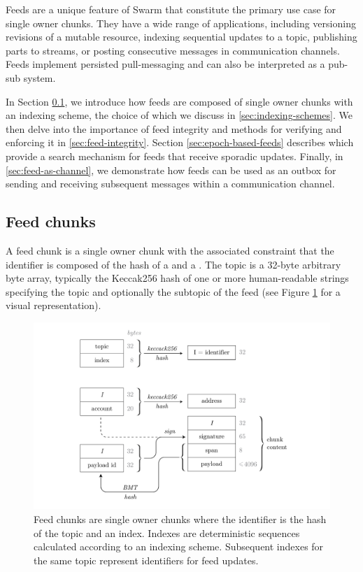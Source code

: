\green{}

Feeds are a unique feature of Swarm that constitute the primary use case for single owner chunks. They have a wide range of applications, including versioning revisions of a mutable resource, indexing sequential updates to a topic, publishing parts to streams, or posting consecutive messages in communication channels. Feeds implement persisted pull-messaging and can also be interpreted as a pub-sub system.

In Section \ref{sec:feed-chunks}, we introduce how feeds are composed of single owner chunks with an indexing scheme, the choice of which we discuss in \ref{sec:indexing-schemes}. We then delve into the importance of feed integrity and methods for verifying and enforcing it in \ref{sec:feed-integrity}. Section \ref{sec:epoch-based-feeds} describes  which provide a search mechanism for feeds that receive sporadic updates. Finally, in \ref{sec:feed-as-channel}, we demonstrate how feeds can be used as an outbox for sending and receiving subsequent messages within a communication channel.


\subsection{Feed chunks \statusyellow}\label{sec:feed-chunks}

A feed chunk is a single owner chunk with the associated constraint that the identifier is composed of the hash of a  and a . The topic is a 32-byte arbitrary byte array, typically the Keccak256 hash of one or more human-readable strings specifying the topic and optionally the subtopic of the feed (see Figure \ref{fig:feed-chunk} for a visual representation). 


\begin{figure}[htbp]
\centering
\includegraphics[width=\textwidth]{fig/feed-chunk.pdf}
\caption[Feed chunk \statusgreen]{Feed chunks are single owner chunks where the identifier is the hash of the topic and an index. Indexes are deterministic sequences calculated according to an indexing scheme. Subsequent indexes for the same topic represent identifiers for feed updates.}
\label{fig:feed-chunk}
\end{figure}

